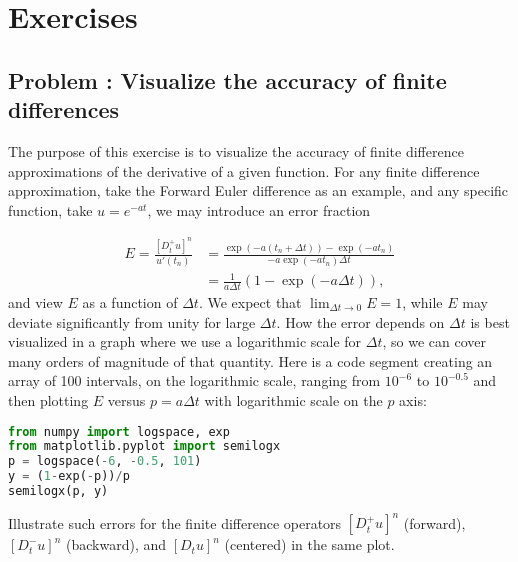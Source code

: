 \documentclass[graybox,sectrefs,envcountresetchap,open=right,final]{svmonodo}
\newenvironment{doconceexercise}{}{}
\newcounter{doconceexercisecounter}
\begin{document}
\section{Exercises}



\begin{doconceexercise}

\subsection*{Problem \thedoconceexercisecounter: Visualize the accuracy of finite differences}

\label{decay:analysis:exer:fd:exp:plot}

The purpose of this exercise is to visualize the accuracy of finite difference
approximations of the derivative of a given function.
For any finite difference approximation, take the Forward Euler difference
as an example, and any specific function, take  $u=e^{-at}$,
we may introduce an error fraction

\begin{align*}
E = \frac{[D_t^+ u]^n}{u'(t_n)} &= \frac{\exp{(-a(t_n+\Delta t))} - \exp{(-at_n)}}{-a\exp{(-at_n)\Delta t}}\\ 
&= \frac{1}{a\Delta t}\left(1 -\exp{(-a\Delta t)}\right),
\end{align*}
and view $E$ as a function of $\Delta t$. We expect that
$\lim_{\Delta t\rightarrow 0}E=1$, while $E$ may deviate significantly from
unity for large $\Delta t$. How the error depends on $\Delta t$ is best
visualized in a graph where we use a logarithmic scale for $\Delta t$,
so we can cover many orders of magnitude of that quantity. Here is
a code segment creating an array of 100 intervals, on the logarithmic
scale, ranging from $10^{-6}$ to $10^{-0.5}$ and then plotting $E$ versus
$p=a\Delta t$ with logarithmic scale on the $p$ axis:

\begin{lstlisting}[language=Python,style=blue1_bluegreen]
from numpy import logspace, exp
from matplotlib.pyplot import semilogx
p = logspace(-6, -0.5, 101)
y = (1-exp(-p))/p
semilogx(p, y)
\end{lstlisting}
Illustrate such errors for the finite difference operators $[D_t^+u]^n$
(forward), $[D_t^-u]^n$ (backward), and $[D_t u]^n$ (centered) in
the same plot.


\end{doconceexercise}
\end{document}
